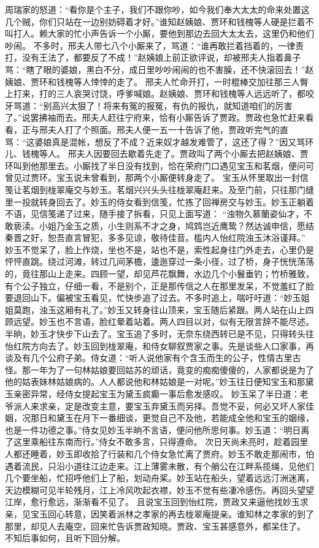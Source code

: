 \documentclass[12pt,oneside]{book}
\begin{document}
周瑞家的怒道：“看你是个主子，我们不跟你吵，如今我们奉大太太的命来处置这几个贼，你们只站在一边别妨碍着才好。”谁知赵姨娘、贾环和钱槐等人硬是拦着不叫打人。赖大家的忙小声告诉一个小厮，要他到那边去回大太太去，这里仍和他们吵闹。
不多时，邢夫人带七八个小厮来了，骂道：“谁再敢拦着挡着的，一律责打，没有王法了，都要反了不成！”赵姨娘上前正欲评说，却被邢夫人指着鼻子骂：“瞎了眼的婆娘，黑白不分，成日里吵吵闹闹的也不害臊，还不快滚回去！”赵姨娘、贾环和钱槐等人悻悻的走了。
邢夫人忙命开打，一时棍棒交加往那三人臀上打来，打的三人哀哭讨饶，呼爹喊娘。赵姨娘、贾环和钱槐等人远远听了，都咬牙骂道：“别高兴太狠了！将来有冤的报冤，有仇的报仇，就知道咱们的厉害了。”说罢拂袖而去。邢夫人赶往宁府来，恰有小厮告诉了贾政。贾政也急忙赶来看看，正与邢夫人打了个照面。邢夫人便一五一十告诉了他，贾政听完气的直骂：“这婆娘真是混帐，想反了不成？近来奴才越发难管了，这还了得？”因又骂环儿、钱槐等人。
邢夫人因要回去歇着先走了。贾政叫了两个小厮去把赵姨娘、贾环叫到他那里去。小厮找了半日没有找到，恰在荣府门口遇见宝玉和茗烟，便问可曾见过贾环。宝玉说未曾看到，那两个小厮便转身走了。
宝玉从怀里取出一封信笺让茗烟到栊翠庵交与妙玉。茗烟兴兴头头往栊翠庵赶来。及至门前，只往那门缝里一投就转身回去了。妙玉的侍女看到信笺，忙拣了回禅房交与妙玉。妙玉正躺着不语，见信笺递了过来，随手接了拆看，只见上面写道：
“浊物久慕蘭姿仙才，不敢亵渎。小姐乃金玉之质，小生则系不才之身，鸠鸩岂近鹰鸷？然达诚申信，愿结秦晋之好，恕吾直言冒犯，多多见谅，敬待佳音。槛内人怡红院浊玉沐浴谨拜。”
妙玉不觉呆了，脸上作烧，坐也不是，站也不是，索性起身往门外走去，心里仍是怦怦直跳。绕过河滩，转过几间茅檐，逶迤穿过一条小径，过了桥，身子恍恍荡荡的，竟往那山上走来。四顾一望，却见芦花飘舞，水边几个小鬟垂钓；竹桥雅致，有个公子独立，仔细一看，不是别个，正是那传信之人在那里发呆，不觉羞红了脸要退回山下。偏被宝玉看见，忙快步追了过去。不多时追上，喘吁吁道：“妙玉姐姐莫跑，浊玉这厢有礼了。”妙玉又转身往山顶来，宝玉随后紧跟。两人站在山上四顾远望。妙玉也不言语，脸红晕着站着。两人四目以对，似有无限言辞不能尽述。
半晌，妙玉才快步下山去了。宝玉追了多时，无奈东绕西转已是不见，只得转头往怡红院方向去了。妙玉回到栊翠庵，和侍女聊叙贾家之事。先是谈些人口家事，再谈及有几个公府子弟。侍女道：“听人说他家有个含玉而生的公子，性情古里古怪。那一年为了一句林姑娘要回姑苏的顽话，竟变的痴痴傻傻的，人家都说是为了他的姑表妹林姑娘病的。人人都说他和林姑娘是一对呢。”妙玉往日便知宝玉和那黛玉亲密异常，经侍女提起宝玉为黛玉疯癫一事后愈发感叹。
妙玉呆了半日道：老爷派人来求亲，定是改变主意，要宝玉弃黛玉而另择。吾觉不妥，何必又坏人家佳姻，况那日和黛玉在月下一番细谈，更觉自己不及他，若能成全他和宝玉的姻缘，也是一件功德之事。”侍女见妙玉半晌不言语，便问他所思何事。妙玉道：“明日离了这里乘船往东南而行。”侍女不敢多言，只得遵命。
次日天尚未亮时，趁着园里人都还睡着，妙玉即收拾了行装和几个侍女急忙离了贾府。妙玉不敢走那闹市，怕遇着流民，只沿小道往江边走来。江上薄雾未散，有个艄公在江畔系揽绳，见他们几个要坐船，忙招呼他们上了船，划动舟桨。妙玉站在船头，望着远远汀洲迷离，天边模糊可见半轮残月，江上冷风吹起衣襟，妙玉不觉有些凄冷感伤。再回头望望江岸，愈行愈远，渐渐看不见了。
且说宝玉回到怡红院，贾政又来逼他找妙玉求亲，见宝玉回心转意，因笑着派林之孝家的再去栊翠庵提亲。谁知林之孝家的到了那里，却见人去庵空，回来忙告诉贾政知晓。贾政、宝玉甚感意外，都呆住了。
不知后事如何，且听下回分解。
 
\end{document}
